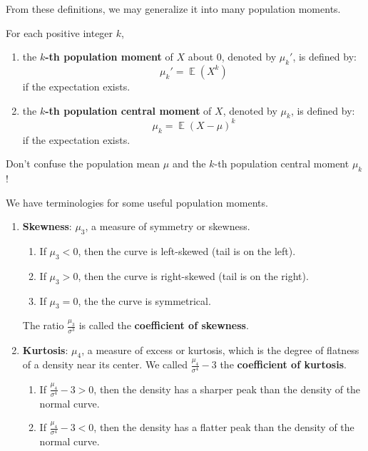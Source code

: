 \documentclass{huhtakm-template-book-v2}
\DeclareMathOperator{\E}{\mathbb{E}}
\begin{document}
\newpage
From these definitions, we may generalize it into many population moments.
\begin{defn}
	For each positive integer $k$, 
	\begin{enumerate}
		\item the \textbf{$k$-th population moment} of $X$ about $0$, denoted by $\mu_{k}'$, is defined by:
		\begin{equation*}
			\mu_{k}'=\E(X^{k})
		\end{equation*}
		if the expectation exists.
		\item the \textbf{$k$-th population central moment} of $X$, denoted by $\mu_{k}$, is defined by:
		\begin{equation*}
			\mu_{k}=\E(X-\mu)^{k}
		\end{equation*}
		if the expectation exists.
	\end{enumerate}
\end{defn}
\begin{rem}
	Don't confuse the population mean $\mu$ and the $k$-th population central moment $\mu_{k}$!
\end{rem}
\begin{eg}
	We have terminologies for some useful population moments.
	\begin{enumerate}
		\item \textbf{Skewness}: $\mu_{3}$, a measure of symmetry or skewness.
		\begin{enumerate}
			\item If $\mu_{3}<0$, then the curve is left-skewed (tail is on the left).
			\item If $\mu_{3}>0$, then the curve is right-skewed (tail is on the right).
			\item If $\mu_{3}=0$, the the curve is symmetrical.
		\end{enumerate}
		The ratio $\frac{\mu_{3}}{\sigma^{3}}$ is called the \textbf{coefficient of skewness}.
		\item \textbf{Kurtosis}: $\mu_{4}$, a measure of excess or kurtosis, which is the degree of flatness of a density near its center. We called $\frac{\mu_{4}}{\sigma^{4}}-3$ the \textbf{coefficient of kurtosis}.
		\begin{enumerate}
			\item If $\frac{\mu_{4}}{\sigma^{4}}-3>0$, then the density has a sharper peak than the density of the normal curve.
			\item If $\frac{\mu_{4}}{\sigma^{4}}-3<0$, then the density has a flatter peak than the density of the normal curve.
		\end{enumerate}
	\end{enumerate}
\end{eg}
\end{document}
